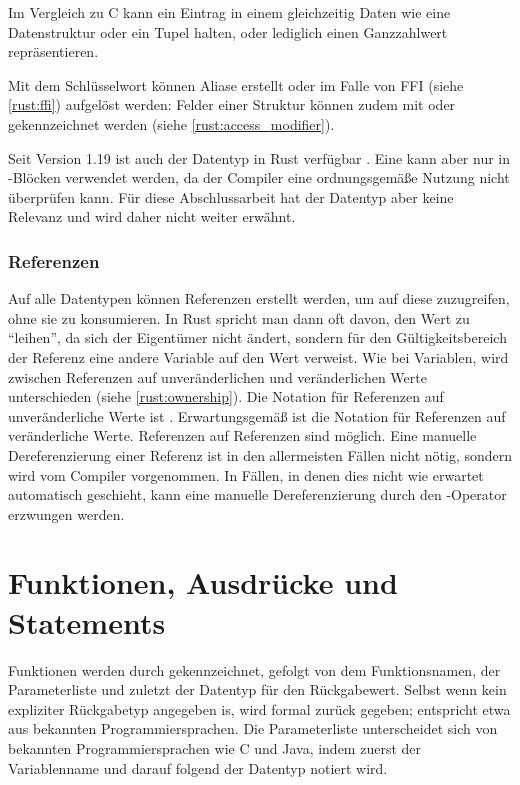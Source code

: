 Im Vergleich zu C kann ein Eintrag in einem  gleichzeitig Daten wie eine Datenstruktur oder ein Tupel halten, oder lediglich einen Ganzzahlwert repräsentieren.

Mit dem  Schlüsselwort können Aliase erstellt oder im Falle von FFI (siehe \autoref{rust:ffi}) aufgelöst werden: 
Felder einer Struktur können zudem mit  oder  gekennzeichnet werden (siehe \autoref{rust:access_modifier}).

Seit Version 1.19 ist auch der Datentyp  in Rust verfügbar \cite{rust:v1.19}.
Eine  kann aber nur in -Blöcken verwendet werden, da der Compiler eine ordnungsgemäße Nutzung nicht überprüfen kann.
Für diese Abschlussarbeit hat der Datentyp aber keine Relevanz und wird daher nicht weiter erwähnt.

\subsubsection{Referenzen}
\label{rust:reference}

Auf alle Datentypen können Referenzen erstellt werden, um auf diese zuzugreifen, ohne sie zu konsumieren.
In Rust spricht man dann oft davon, den Wert zu \enquote{leihen}, da sich der Eigentümer nicht ändert, sondern für den Gültigkeitsbereich der Referenz eine andere Variable auf den Wert verweist.
Wie bei Variablen, wird zwischen Referenzen auf unveränderlichen und veränderlichen Werte unterschieden (siehe \autoref{rust:ownership}).
Die Notation für Referenzen auf unveränderliche Werte ist .
Erwartungsgemäß ist  die Notation für Referenzen auf veränderliche Werte.
Referenzen auf Referenzen sind möglich.
Eine manuelle Dereferenzierung einer Referenz ist in den allermeisten Fällen nicht nötig, sondern wird vom Compiler vorgenommen.
In Fällen, in denen dies nicht wie erwartet automatisch geschieht, kann eine manuelle Dereferenzierung durch den \rustcinline{*}-Operator erzwungen werden.

\section{Funktionen, Ausdrücke und Statements}
\label{rust:fn}

Funktionen werden durch  gekennzeichnet, gefolgt von dem Funktionsnamen, der Parameterliste und zuletzt der Datentyp für den Rückgabewert.
Selbst wenn kein expliziter Rückgabetyp angegeben is, wird formal \rustcinline{()} zurück gegeben; \rustcinline{()} entspricht etwa  aus bekannten Programmiersprachen.
Die Parameterliste unterscheidet sich von bekannten Programmiersprachen wie C und Java, indem zuerst der Variablenname und darauf folgend der Datentyp notiert wird.


